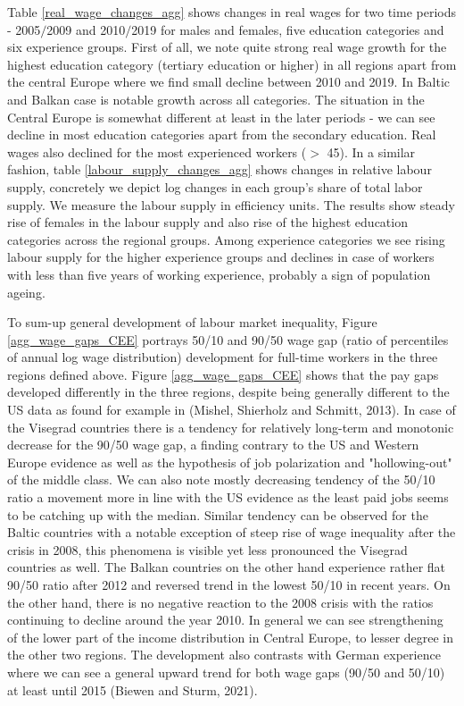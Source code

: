 \documentclass{article}
\begin{document}
Table \ref{real_wage_changes_agg} shows changes in real wages for two time periods - 2005$/$2009 and 2010$/$2019 for males and females, five education categories and six experience groups. First of all, we note quite strong real wage growth for the highest education category (tertiary education or higher) in all regions apart from the central Europe where we find small decline between 2010 and 2019. In Baltic and Balkan case is notable growth across all categories. The situation in the Central Europe is somewhat different at least in the later periods - we can see decline in most education categories apart from the secondary education. Real wages also declined for the most experienced workers ($>$ 45).
In a similar fashion, table \ref{labour_supply_changes_agg} shows changes in relative labour supply, concretely we depict log changes in each group's share of total labor supply. We measure the labour supply in efficiency units. The results show steady rise of females in the labour supply and also rise of the highest education categories across the regional groups. Among experience categories we see rising labour supply for the higher experience groups and declines in case of workers with less than five years of working experience, probably a sign of population ageing.

To sum-up general development of labour market inequality, Figure \ref{agg_wage_gaps_CEE} portrays 50/10 and 90/50 wage gap (ratio of percentiles of annual log wage distribution) development for full-time workers in the three regions defined above.
Figure \ref{agg_wage_gaps_CEE} shows that the pay gaps developed differently in the three regions, despite being generally different to the US data as found for example in (Mishel, Shierholz and Schmitt, 2013). In case of the Visegrad countries there is a tendency for relatively long-term and monotonic decrease for the 90/50 wage gap, a finding contrary to the US and Western Europe evidence as well as the hypothesis of job polarization and "hollowing-out" of the middle class. We can also note mostly decreasing tendency of the 50/10 ratio a movement more in line with the US evidence as the least paid jobs seems to be catching up with the median. Similar tendency can be observed for the Baltic countries with a notable exception of steep rise of wage inequality after the crisis in 2008, this phenomena is visible yet less pronounced the Visegrad countries as well. The Balkan countries on the other hand experience rather flat 90/50 ratio after 2012 and reversed trend in the lowest 50/10 in recent years. On the other hand, there is no negative reaction to the 2008 crisis with the ratios continuing to decline around the year 2010.
In general we can see strengthening of the lower part of the income distribution in Central Europe, to lesser degree in the other two regions. The development also contrasts with German experience where we can see a general upward trend for both wage gaps (90/50 and 50/10) at least until 2015 (Biewen and Sturm, 2021).
\end{document}
